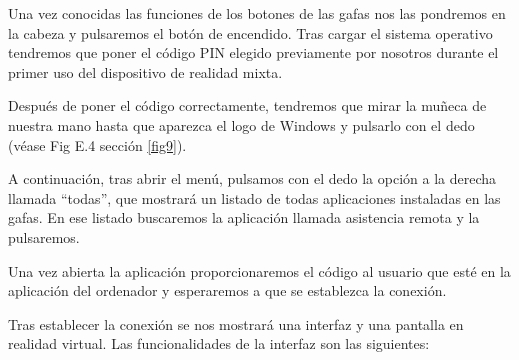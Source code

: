 
Una vez conocidas las funciones de los botones de las gafas nos las pondremos en la cabeza y pulsaremos el botón de encendido. Tras cargar el sistema operativo tendremos que poner el código PIN elegido previamente por nosotros durante el primer uso del dispositivo de realidad mixta.

Después de poner el código correctamente, tendremos que mirar la muñeca de nuestra mano hasta que aparezca el logo de Windows y pulsarlo con el dedo (véase Fig E.4 sección \ref{fig9}). 


A continuación, tras abrir el menú, pulsamos con el dedo la opción a la derecha llamada “todas”, que mostrará un listado de todas aplicaciones instaladas en las gafas. En ese listado buscaremos la aplicación llamada asistencia remota y la pulsaremos. 


Una vez abierta la aplicación proporcionaremos el código al usuario que esté en la aplicación del ordenador y esperaremos a que se establezca la conexión.


Tras establecer la conexión se nos mostrará una interfaz y una pantalla en realidad virtual. Las funcionalidades de la interfaz son las siguientes:

